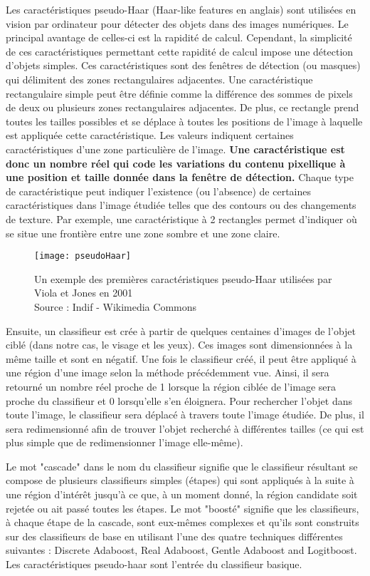 Les caractéristiques pseudo-Haar (Haar-like features en anglais) sont utilisées en vision par ordinateur pour détecter des objets dans des images numériques. Le principal avantage de celles-ci est la rapidité de calcul. Cependant, la simplicité de ces caractéristiques permettant cette rapidité de calcul impose une détection d’objets simples. Ces caractéristiques sont des fenêtres de détection (ou masques) qui délimitent des zones rectangulaires adjacentes. Une caractéristique rectangulaire simple peut être définie comme la différence des sommes de pixels de deux ou plusieurs zones rectangulaires adjacentes. De plus, ce rectangle prend toutes les tailles possibles et se déplace à toutes les positions de l’image à laquelle est appliquée cette caractéristique. Les valeurs indiquent certaines caractéristiques d’une zone particulière de l’image. \textbf{Une caractéristique est donc un nombre réel qui code les variations du contenu pixellique à une position et taille donnée dans la fenêtre de détection.} Chaque type de caractéristique peut indiquer l’existence (ou l’absence) de certaines caractéristiques dans l’image étudiée telles que des contours ou des changements de texture. Par exemple, une caractéristique à 2 rectangles permet d’indiquer où se situe une frontière entre une zone sombre et une zone claire.

\begin{figure}[H]
  \centering
  \texttt{[image: pseudoHaar]}
  \caption{Un exemple des premières caractéristiques pseudo-Haar utilisées par Viola et Jones en 2001 \\Source : Indif - Wikimedia Commons}
  \label{fig:pseudoHaar}
\end{figure}

Ensuite, un classifieur est crée à partir de quelques centaines d’images de l’objet ciblé (dans notre cas, le visage et les yeux). Ces images sont dimensionnées à la même taille et sont en négatif. Une fois le classifieur créé, il peut être appliqué à une région d’une image selon la méthode précédemment vue. Ainsi, il sera retourné un nombre réel proche de 1 lorsque la région ciblée de l’image sera proche du classifieur et 0 lorsqu’elle s’en éloignera. Pour rechercher l’objet dans toute l’image, le classifieur sera déplacé à travers toute l’image étudiée. De plus, il sera redimensionné afin de trouver l’objet recherché à différentes tailles (ce qui est plus simple que de redimensionner l’image elle-même). 

Le mot "cascade" dans le nom du classifieur signifie que le classifieur résultant se compose de plusieurs classifieurs simples (étapes) qui sont appliqués à la suite à une région d’intérêt jusqu’à ce que, à un moment donné, la région candidate soit rejetée ou ait passé toutes les étapes. Le mot "boosté" signifie que les classifieurs, à chaque étape de la cascade, sont eux-mêmes complexes et qu’ils sont construits sur des classifieurs de base en utilisant l'une des quatre techniques différentes suivantes : Discrete Adaboost, Real Adaboost, Gentle Adaboost and Logitboost. Les caractéristiques pseudo-haar sont l’entrée du classifieur basique.

